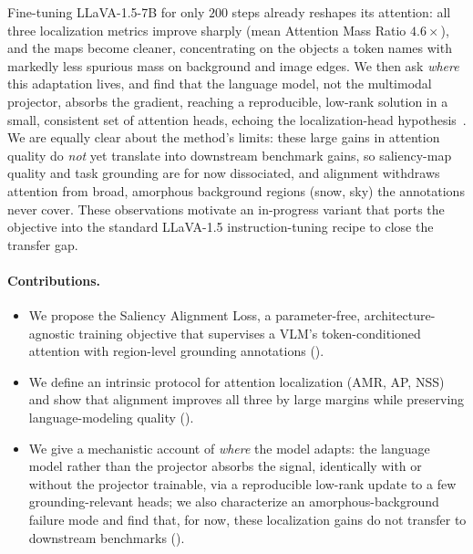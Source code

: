 Fine-tuning LLaVA-1.5-7B for only $200$ steps already reshapes its attention: all three localization metrics improve sharply (mean Attention Mass Ratio $4.6{\times}$), and the maps become cleaner, concentrating on the objects a token names with markedly less spurious mass on background and image edges. We then ask \emph{where} this adaptation lives, and find that the language model, not the multimodal projector, absorbs the gradient, reaching a reproducible, low-rank solution in a small, consistent set of attention heads, echoing the localization-head hypothesis~\citep{kang2025your}. We are equally clear about the method's limits: these large gains in attention quality do \emph{not} yet translate into downstream benchmark gains, so saliency-map quality and task grounding are for now dissociated, and alignment withdraws attention from broad, amorphous background regions (snow, sky) the annotations never cover. These observations motivate an in-progress variant that ports the objective into the standard LLaVA-1.5 instruction-tuning recipe to close the transfer gap.

\paragraph{Contributions.}
\begin{itemize}
    \item We propose the Saliency Alignment Loss, a parameter-free, architecture-agnostic training objective that supervises a VLM's token-conditioned attention with region-level grounding annotations ().
    \item We define an intrinsic protocol for attention localization (AMR, AP, NSS) and show that alignment improves all three by large margins while preserving language-modeling quality ().
    \item We give a mechanistic account of \emph{where} the model adapts: the language model rather than the projector absorbs the signal, identically with or without the projector trainable, via a reproducible low-rank update to a few grounding-relevant heads; we also characterize an amorphous-background failure mode and find that, for now, these localization gains do not transfer to downstream benchmarks ().
\end{itemize}
